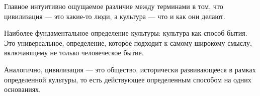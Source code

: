 Главное интуитивно ощущаемое различие между терминами в том, что цивилизация --- это
какие-то люди, а культура --- что и как они делают.

Наиболее фундаментальное определение культуры: культура как способ бытия. 
Это универсальное, определение, которое подходит к самому широкому смыслу,
включающему не только человеческое бытие. 


Аналогично, цивилизация --- это общество, исторически развивающееся в рамках определенной культуры, то есть действующее определенным способом на одних основаниях. 


